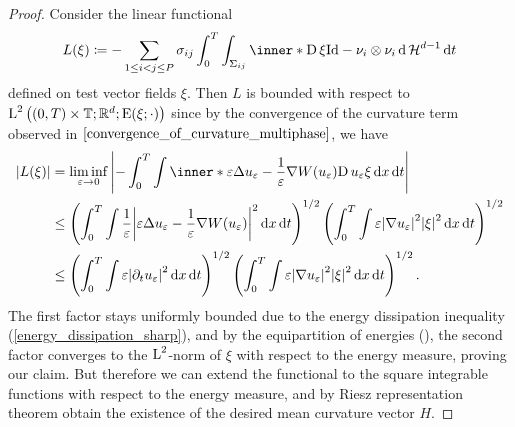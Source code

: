 \begin{proof}
	Consider the linear functional 
	\begin{equation*}
		L ( \xi )
		\coloneqq
		- \sum_{ 1 \leq i < j \leq P }
			\sigma_{ i j }
			\int_{ 0 }^{ T }
				\int_{ \Sigma_{ i j } }
					\inner*{ \diff \xi }{ \mathrm{Id} - \nu_{ i } \otimes \nu_{ 
					i } }
				\dd{ \hm^{ d - 1 } }
			\dd{ t }
	\end{equation*}
	defined on test vector fields $ \xi $. Then $ L $ is bounded with respect 
	to $ \operatorname{L}^{ 2 } \left( ( 0 , T ) \times \operatorname{\mathbb{T}} ; \mathbb{ R }^{ d } ; 
	\operatorname{E} ( \xi ; \cdot ) \right) $ since by the convergence of the curvature 
	term observed in $ \Cref{convergence_of_curvature_multiphase} $, we have
	\begin{align*}
		\abs{ L ( \xi ) }
		& =
		\liminf_{ \varepsilon \to 0 }
			\abs{ 
				-
				\int_{ 0 }^{ T }
					\int
						\inner*{
							\varepsilon \Delta u_{ \varepsilon } 
							-
							\frac{ 1 }{ \varepsilon }
							\nabla W ( u_{ \varepsilon } )
						}
						{ \diff u_{ \varepsilon } \xi }
					\dd{ x }
				\dd{ t }
			}
		\\
		& \leq
		\left(
			\int_{ 0 }^{ T }
				\int
					\frac{ 1 }{ \varepsilon }
					\abs{ 
						\varepsilon \Delta u_{ \varepsilon }
						-
						\frac{ 1 }{ \varepsilon }
						\nabla W ( u_{ \varepsilon } )
					}^{ 2 }
				\dd{ x }
			\dd{ t }
		\right)^{ 1/2 }
		\left(
			\int_{ 0 }^{ T }
				\int
					\varepsilon
					\abs{ \nabla u_{ \varepsilon } }^{ 2 }
					\abs{ \xi }^{ 2 }
				\dd{ x }
			\dd{ t }
		\right)^{ 1/2 }
		\\
		& \leq
				\left(
		\int_{ 0 }^{ T }
		\int
		 \varepsilon
		\abs{ 
		\partial_{ t } u_{ \varepsilon }
		}^{ 2 }
		\dd{ x }
		\dd{ t }
		\right)^{ 1/2 }
		\left(
		\int_{ 0 }^{ T }
		\int
		\varepsilon
		\abs{ \nabla u_{ \varepsilon } }^{ 2 }
		\abs{ \xi }^{ 2 }
		\dd{ x }
		\dd{ t }
		\right)^{ 1/2 }.
	\end{align*}
	The first factor stays uniformly bounded due to the energy dissipation 
	inequality (\ref{energy_dissipation_sharp}), and by the equipartition of 
	energies (), the second factor 
	converges to the $ \operatorname{L}^{ 2 } $-norm of $ \xi $ with respect to the energy 
	measure, proving our claim. But therefore we can extend the functional to 
	the square integrable functions with respect to the energy measure, and by 
	Riesz representation theorem obtain the existence of the desired mean 
	curvature vector $ H $.
	

\end{proof}
